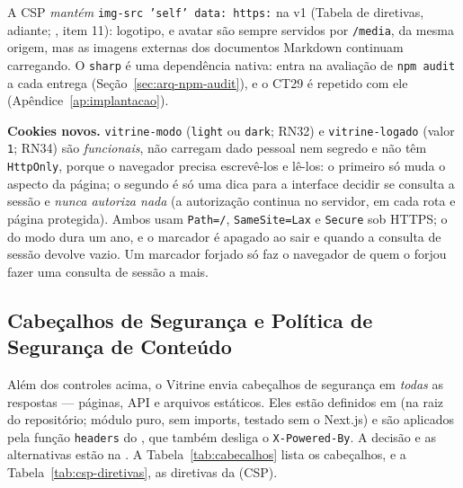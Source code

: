 A CSP \emph{mantém} \texttt{img-src 'self' data: https:} na v1 (Tabela de diretivas, adiante; , item 11): logotipo,  e avatar são sempre servidos por \texttt{/media}, da mesma origem, mas as imagens externas dos documentos Markdown continuam carregando. O \texttt{sharp} é uma dependência nativa: entra na avaliação de \texttt{npm audit} a cada entrega (Seção~\ref{sec:arq-npm-audit}), e o CT29 é repetido com ele (Apêndice~\ref{ap:implantacao}).

\textbf{Cookies novos.} \texttt{vitrine-modo} (\texttt{light} ou \texttt{dark}; RN32) e \texttt{vitrine-logado} (valor \texttt{1}; RN34) são \emph{funcionais}, não carregam dado pessoal nem segredo e não têm \texttt{HttpOnly}, porque o navegador precisa escrevê-los e lê-los: o primeiro só muda o aspecto da página; o segundo é só uma dica para a interface decidir se consulta a sessão e \emph{nunca autoriza nada} (a autorização continua no servidor, em cada rota e página protegida). Ambos usam \texttt{Path=/}, \texttt{SameSite=Lax} e \texttt{Secure} sob HTTPS; o do modo dura um ano, e o marcador é apagado ao sair e quando a consulta de sessão devolve vazio. Um marcador forjado só faz o navegador de quem o forjou fazer uma consulta de sessão a mais.

\subsection{Cabeçalhos de Segurança e Política de Segurança de Conteúdo}\label{sec:arq-csp}

Além dos controles acima, o Vitrine envia cabeçalhos de segurança em \emph{todas} as respostas --- páginas, API e arquivos estáticos. Eles estão definidos em  (na raiz do repositório; módulo puro, sem imports, testado sem o Next.js) e são aplicados pela função \texttt{headers} do , que também desliga o \texttt{X-Powered-By}. A decisão e as alternativas estão na . A Tabela~\ref{tab:cabecalhos} lista os cabeçalhos, e a Tabela~\ref{tab:csp-diretivas}, as diretivas da  (CSP).

